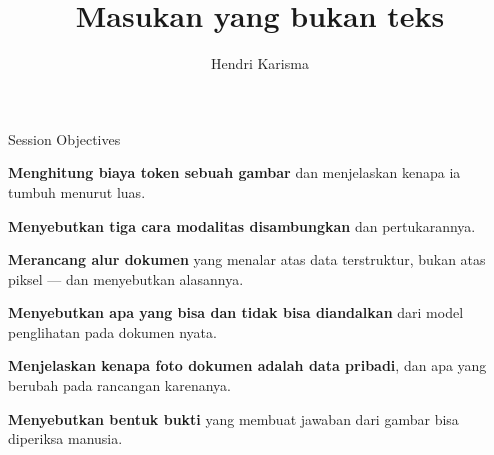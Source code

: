 \documentclass[aspectratio=169,11pt,t]{beamer}
\title{Masukan yang bukan teks}
\author{Hendri Karisma}
\date{}
\begin{document}
\covertitle

\begin{frame}[shrink=25]{Session Objectives}
\begin{isteps}
\item \textbf{Menghitung biaya token sebuah gambar} dan menjelaskan kenapa ia tumbuh menurut luas.
\item \textbf{Menyebutkan tiga cara modalitas disambungkan} dan pertukarannya.
\item \textbf{Merancang alur dokumen} yang menalar atas data terstruktur, bukan atas piksel --- dan menyebutkan alasannya.
\item \textbf{Menyebutkan apa yang bisa dan tidak bisa diandalkan} dari model penglihatan pada dokumen nyata.
\item \textbf{Menjelaskan kenapa foto dokumen adalah data pribadi}, dan apa yang berubah pada rancangan karenanya.
\item \textbf{Menyebutkan bentuk bukti} yang membuat jawaban dari gambar bisa diperiksa manusia.
\end{isteps}

\vskip 6pt
\vskip 4pt
\vskip 2pt
\end{frame}

\end{document}

